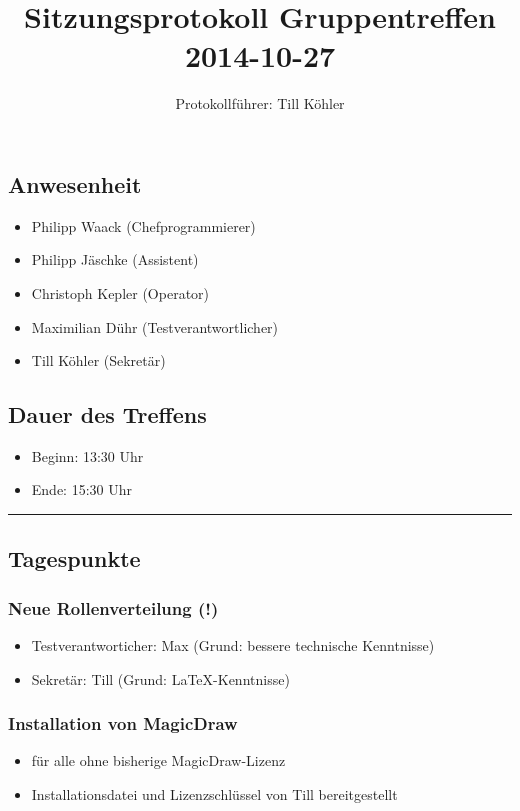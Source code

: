 \documentclass[12pt,a4paper]{article}
\author{Protokollführer: Till Köhler}
\title{Sitzungsprotokoll Gruppentreffen 2014-10-27}
\date{}
\begin{document}
\maketitle

\subsection*{Anwesenheit}
\medskip
\begin{itemize}
\item Philipp Waack (Chefprogrammierer)
\item Philipp Jäschke (Assistent)
\item Christoph Kepler (Operator)
\item Maximilian Dühr (Testverantwortlicher)
\item Till Köhler (Sekretär)
\end{itemize}

\subsection*{Dauer des Treffens}
\medskip
\begin{itemize}
\item Beginn: 13:30 Uhr
\item Ende: 15:30 Uhr
\end{itemize}

\noindent\rule{\textwidth}{1pt}

\subsection*{Tagespunkte}
\medskip

\subsubsection*{Neue Rollenverteilung (!)}
\begin{itemize}
\item Testverantworticher: Max (Grund: bessere technische Kenntnisse)
\item Sekretär: Till (Grund: {\LaTeX}-Kenntnisse)
\end{itemize}

\subsubsection*{Installation von MagicDraw}
\begin{itemize}
\item für alle ohne bisherige MagicDraw-Lizenz
\item Installationsdatei und Lizenzschlüssel von Till bereitgestellt
\end{itemize}
\end{document}
